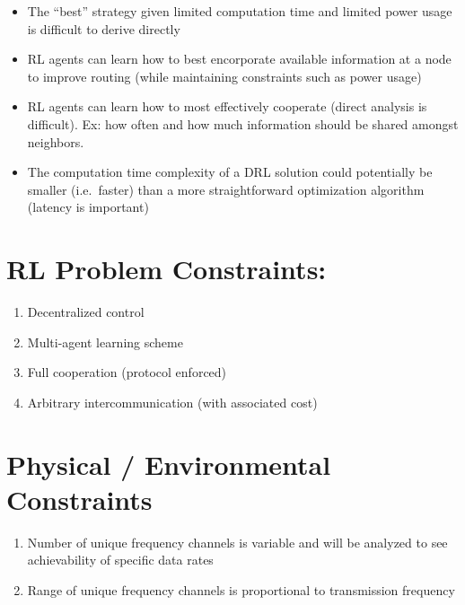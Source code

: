 \documentclass[11pt]{article}
\providecommand{\tightlist}{%
      \setlength{\itemsep}{0pt}\setlength{\parskip}{0pt}}
\begin{document}
\begin{itemize}
\tightlist
\item
  The ``best'' strategy given limited computation time and limited power
  usage is difficult to derive directly
\item
  RL agents can learn how to best encorporate available information at a
  node to improve routing (while maintaining constraints such as power
  usage)
\item
  RL agents can learn how to most effectively cooperate (direct analysis
  is difficult). Ex: how often and how much information should be shared
  amongst neighbors.
\item
  The computation time complexity of a DRL solution could potentially be
  smaller (i.e.~faster) than a more straightforward optimization
  algorithm (latency is important)
\end{itemize}

    \hypertarget{rl-problem-constraints}{%
\section{RL Problem Constraints:}\label{rl-problem-constraints}}

\begin{enumerate}
\def\labelenumi{\arabic{enumi}.}
\item
  Decentralized control
\item
  Multi-agent learning scheme
\item
  Full cooperation (protocol enforced)
\item
  Arbitrary intercommunication (with associated cost)
\end{enumerate}

    \hypertarget{physical-environmental-constraints}{%
\section{Physical / Environmental
Constraints}\label{physical-environmental-constraints}}

\begin{enumerate}
\def\labelenumi{\arabic{enumi}.}
\tightlist
\item
  Number of unique frequency channels is variable and will be
  analyzed to see achievability of specific data rates
\item
  Range of unique frequency channels is proportional to transmission
  frequency
\end{enumerate}
\end{document}
